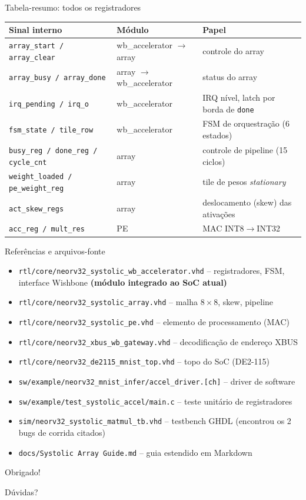 \documentclass[aspectratio=169,10pt]{beamer}
\begin{document}
\begin{frame}{Tabela-resumo: todos os registradores}
  \vspace{1em}
  \tiny
  \begin{tabularx}{\linewidth}{llX}
    \toprule
    \textbf{Sinal interno} & \textbf{Módulo} & \textbf{Papel} \\
    \midrule
    \texttt{array\_start / array\_clear} & wb\_accelerator $\to$ array & controle do array \\
    \texttt{array\_busy / array\_done}   & array $\to$ wb\_accelerator & status do array \\
    \texttt{irq\_pending / irq\_o}       & wb\_accelerator & IRQ nível, latch por borda de \texttt{done} \\
    \texttt{fsm\_state / tile\_row}      & wb\_accelerator & FSM de orquestração (6 estados) \\
    \texttt{busy\_reg / done\_reg / cycle\_cnt} & array & controle de pipeline (15 ciclos) \\
    \texttt{weight\_loaded / pe\_weight\_reg} & array & tile de pesos \emph{stationary} \\
    \texttt{act\_skew\_regs}             & array & deslocamento (skew) das ativações \\
    \texttt{acc\_reg / mult\_res}        & PE & MAC INT8$\to$INT32 \\
    \bottomrule
  \end{tabularx}
\end{frame}

\begin{frame}{Referências e arquivos-fonte}
  \small
  \begin{itemize}
    \item \texttt{rtl/core/neorv32\_systolic\_wb\_accelerator.vhd} -- registradores,
      FSM, interface Wishbone \textbf{(módulo integrado ao SoC atual)}
    \item \texttt{rtl/core/neorv32\_systolic\_array.vhd} -- malha $8\times8$, skew, pipeline
    \item \texttt{rtl/core/neorv32\_systolic\_pe.vhd} -- elemento de processamento (MAC)
    \item \texttt{rtl/core/neorv32\_xbus\_wb\_gateway.vhd} -- decodificação de endereço XBUS
    \item \texttt{rtl/core/neorv32\_de2115\_mnist\_top.vhd} -- topo do SoC (DE2-115)
    \item \texttt{sw/example/neorv32\_mnist\_infer/accel\_driver.[ch]} -- driver de software
    \item \texttt{sw/example/test\_systolic\_accel/main.c} -- teste unitário de registradores
    \item \texttt{sim/neorv32\_systolic\_matmul\_tb.vhd} -- testbench GHDL (encontrou os 2 bugs de corrida citados)
    \item \texttt{docs/Systolic Array Guide.md} -- guia estendido em Markdown
  \end{itemize}
\end{frame}

\begin{frame}
  \centering
  \Huge Obrigado!
  \vspace{1em}

  \normalsize Dúvidas?
\end{frame}
\end{document}
